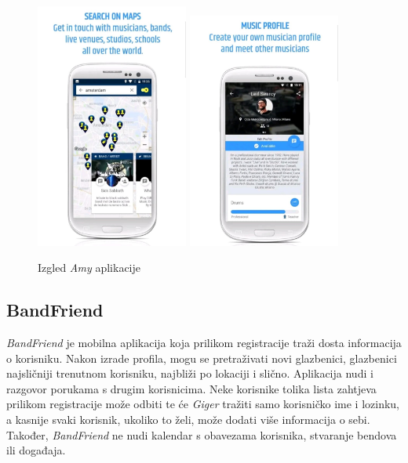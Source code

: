 		\begin{figure}[H]
			\begin{center}
				\includegraphics[width=5cm]{slike/Amy.JPEG}
			\includegraphics[width=5cm]{slike/Amy2.JPEG}
			\end{center}
			\caption{Izgled \textit{Amy} aplikacije}
			\label{fig:promjene2}
		\end{figure}
		
		
		
	    \subsection{BandFriend}
		
		\textit{BandFriend} je mobilna aplikacija koja prilikom registracije traži dosta informacija o korisniku. Nakon izrade profila, mogu se pretraživati novi glazbenici, glazbenici najsličniji trenutnom korisniku, najbliži po lokaciji i slično. Aplikacija nudi i razgovor porukama s drugim korisnicima. Neke korisnike tolika lista zahtjeva prilikom registracije može odbiti te će \textit{Giger} tražiti samo korisničko ime i lozinku, a kasnije svaki korisnik, ukoliko to želi, može dodati više informacija o sebi. Također, \textit{BandFriend} ne nudi kalendar s obavezama korisnika, stvaranje bendova ili događaja.
		

